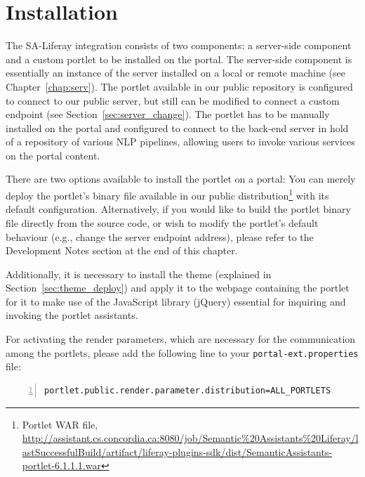 \noindent

\section{Installation}
The SA-Liferay integration consists of two components: a server-side component and a custom portlet to be installed on the portal. The server-side component is essentially an instance of the \sa server installed on a local or remote machine (see Chapter~\ref{chap:serv}). The \sa portlet available in our public repository is configured to connect to our public \sa server, but still can be modified to connect a custom endpoint (see Section~\ref{sec:server_change}). The \sa portlet has to be manually installed on the portal and configured to connect to the back-end \sa server in hold of a repository of various NLP pipelines, allowing users to invoke various services on the portal content. 

There are two options available to install the \sa portlet on a portal: You can merely deploy the portlet's binary file available in our public distribution\footnote{\sa Portlet WAR file, \url{http://assistant.cs.concordia.ca:8080/job/Semantic\%20Assistants\%20Liferay/lastSuccessfulBuild/artifact/liferay-plugins-sdk/dist/SemanticAssistants-portlet-6.1.1.1.war}} with its default configuration. Alternatively, if you would like to build the portlet binary file directly from the source code, or wish to modify the portlet's default behaviour (e.g., change the \sa server endpoint address), please refer to the Development Notes section at the end of this chapter.

Additionally, it is necessary to install the \sa theme (explained in Section~\ref{sec:theme_deploy}) and apply it to the webpage containing the \sa portlet for it to make use of the JavaScript library (jQuery) essential for inquiring and invoking the \sa portlet assistants. 

For activating the render parameters, which are necessary for the communication among the portlets, please add the following line to your \texttt{portal-ext.properties} file: 

\begin{lstlisting}[language=XML,numbers=left,xleftmargin=4mm,columns=flexible]
portlet.public.render.parameter.distribution=ALL_PORTLETS
\end{lstlisting}

